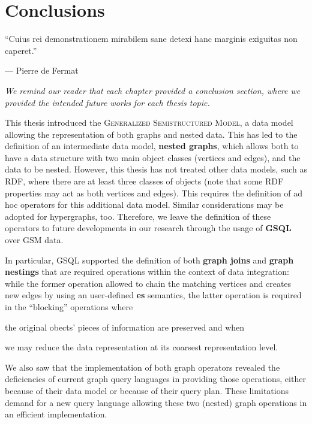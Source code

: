 \chapter{Conclusions}\label{cha:IteMissaEst}
\epigraph{``Cuius rei demonstrationem mirabilem sane detexi hanc marginis exiguitas non caperet.''}{--- Pierre de Fermat}

\textit{We remind our reader that each chapter provided a conclusion section, where we provided the intended future works for each thesis topic.}

This thesis introduced the \textsc{Generalized Semistructured Model}, a data model allowing the representation of both graphs and nested data.  This has led to the definition of an intermediate data model, \textbf{nested graphs}, which allows both to have a data structure with two main object classes (vertices and edges), and the data to be nested. However, this thesis has not treated other data models, such as RDF, where there are at least three classes of objects (note that some RDF properties may act as both vertices and edges). This requires the definition of ad hoc operators for this additional data model. Similar considerations may be adopted for hypergraphs, too. Therefore, we leave the definition of these operators  to future developments in our research through the usage of \textbf{GSQL} over GSM data. %

In particular, GSQL supported the definition of both \textbf{graph joins} and \textbf{graph nestings} that are required operations within the context of data integration: while the former operation allowed to chain the matching vertices and creates new edges by using an user-defined \textbf{es} semantics, the latter operation is required in the ``blocking'' operations where \begin{mylist}
	\item the original obects' pieces of information are preserved and when
	\item we may reduce the data representation at its coarsest representation level.
\end{mylist}
We also saw that the implementation of both graph operators revealed the deficiencies of current graph query languages in providing those operations, either because of their data model or because of their query plan. These limitations demand for a new query language allowing these two (nested) graph operations in an efficient implementation. 

